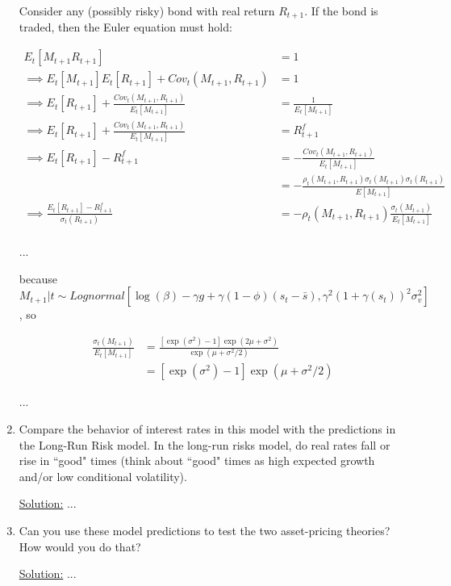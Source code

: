 \documentclass{article}
\begin{document}
\begin{enumerate}
\bigskip

Consider any (possibly risky) bond with real return $R_{t+1}$. If the bond is traded, then the Euler equation must hold:

\begin{align*}
E_t[M_{t+1} R_{t+1}] &= 1\\
\implies
E_t[M_{t+1}] E_t[R_{t+1}] + Cov_t(M_{t+1}, R_{t+1})&= 1\\
\implies
E_t[R_{t+1}] + \frac{Cov_t(M_{t+1}, R_{t+1})}{E_t[M_{t+1}] }&= \frac{1}{E_t[M_{t+1}] }\\
\implies
E_t[R_{t+1}] + \frac{Cov_t(M_{t+1}, R_{t+1})}{E_t[M_{t+1}] }&= R^f_{t+1}\\
\implies
E_t[R_{t+1}] - R^f_{t+1} 
&= -\frac{Cov_t(M_{t+1}, R_{t+1})}{E_t[M_{t+1}] } \\
&= -\frac{\rho_t(M_{t+1}, R_{t+1}) \sigma_t(M_{t+1})\sigma_t(R_{t+1})}{E[M_{t+1}] } \\
\implies
\frac{E_t[R_{t+1}] - R^f_{t+1} }{\sigma_t(R_{t+1})}
&= - \rho_t(M_{t+1}, R_{t+1}) \frac{\sigma_t(M_{t+1}) }{E_t[M_{t+1}] } \\
\end{align*}

...

because $M_{t+1}|t \sim Lognormal[\log(\beta) - \gamma g + \gamma (1 - \phi)(s_t - \bar{s}), \gamma^2(1+\gamma(s_t))^2 \sigma_v^2]$, so 

\begin{align*}
\frac{\sigma_t(M_{t+1})}{E_t[M_{t+1}]} 
&= \frac{[\exp(\sigma^2) - 1] \exp(2 \mu + \sigma^2)}{\exp(\mu + \sigma^2/2)}\\
&= [\exp(\sigma^2) - 1] \exp(\mu +\sigma^2/2)
\end{align*}

...

\item Compare the behavior of interest rates in this model with the predictions in the Long-Run Risk model.  In the long-run risks model, do real rates fall or rise in ``good" times (think about ``good" times as high expected growth and/or low conditional volatility).

\underline{Solution:}  ...

\item Can you use these model predictions to test the two asset-pricing theories? How would you do that?

\underline{Solution:}  ...

\end{enumerate}
\end{document}
